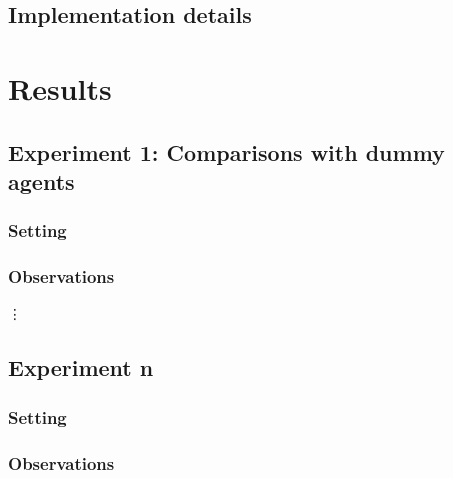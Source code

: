 \documentclass[11pt]{article}
\begin{document}
\subsection{Implementation details}

\section{Results}

\subsection{Experiment 1: Comparisons with dummy agents}

\subsubsection{Setting}

\subsubsection{Observations}

\vdots

\subsection{Experiment n}

\subsubsection{Setting}

\subsubsection{Observations}
\end{document}
